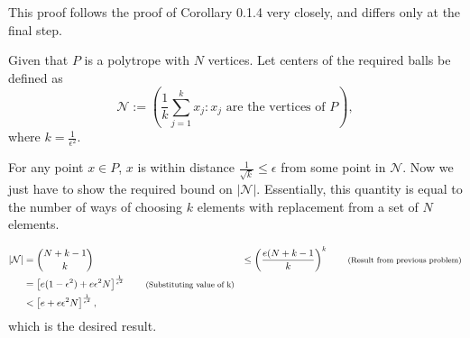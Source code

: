 \documentclass[11pt]{article}
\newenvironment{solution}[1][Solution]{\begin{trivlist}
\item[\hskip \labelsep {\bfseries #1}\hskip \labelsep]}{\end{trivlist}}
\newcommand*{\annot}[1]{\tag*{\footnotesize{(#1)}}}
\begin{document}
\begin{solution}
This proof follows the proof of Corollary 0.1.4 very closely, and differs only at the final step. 

Given that $P$ is a polytrope with $N$ vertices. Let centers of the required balls be defined as
\begin{equation*}
\mathcal{N} := \left( \frac{1}{k}\sum_{j=1}^k x_j : x_j \text{ are the vertices of } P \right),
\end{equation*}
where $k = \frac{1}{\epsilon^2}$.

For any point $x\in P$, $x$ is within distance $\frac{1}{\sqrt{k}} \leq \epsilon$ from some point in $\mathcal{N}$. Now we just have to show the required bound on $\lvert \mathcal{N} \rvert$. Essentially, this quantity is equal to the number of ways of choosing $k$ elements with replacement from a set of $N$ elements. 

\begin{align*}
|\mathcal{N}| &= {N+k-1 \choose k} 
			&\leq \left( \frac{e(N+k-1}{k} \right)^k \annot{Result from previous problem}\\
			&= \left[ e(1-\epsilon^2) + e\epsilon^2 N \right]^{\frac{1}{\epsilon^2}} \annot{Substituting value of k} \\
			&<  \left[ e + e\epsilon^2 N \right]^{\frac{1}{\epsilon^2}},
\end{align*}
which is the desired result.

\end{solution}
\end{document}
